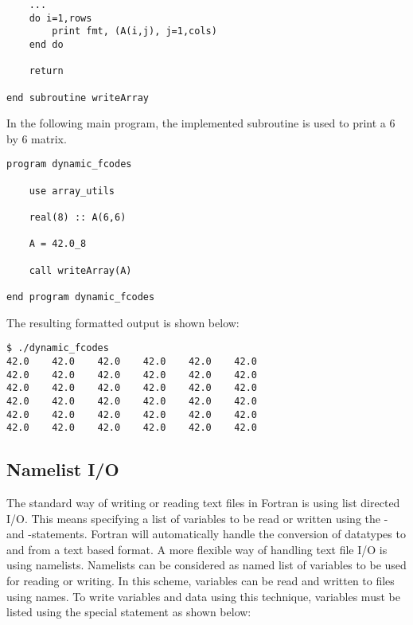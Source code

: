 \begin{lstlisting}
	...
	do i=1,rows
		print fmt, (A(i,j), j=1,cols)
	end do
		
	return
	
end subroutine writeArray
\end{lstlisting}

In the following main program, the implemented  subroutine is used to print a 6 by 6 matrix.

\begin{lstlisting}
program dynamic_fcodes

	use array_utils

	real(8) :: A(6,6)
	
	A = 42.0_8
	
	call writeArray(A)
	
end program dynamic_fcodes
\end{lstlisting}

The resulting formatted output is shown below:

\cmdmode

\begin{lstlisting}
$ ./dynamic_fcodes 
42.0    42.0    42.0    42.0    42.0    42.0    
42.0    42.0    42.0    42.0    42.0    42.0    
42.0    42.0    42.0    42.0    42.0    42.0    
42.0    42.0    42.0    42.0    42.0    42.0    
42.0    42.0    42.0    42.0    42.0    42.0    
42.0    42.0    42.0    42.0    42.0    42.0    
\end{lstlisting}%

\fmode

\subsection{Namelist I/O}

The standard way of writing or reading text files in Fortran is using list directed I/O. This means specifying a list of variables to be read or written using the - and -statements. Fortran will automatically handle the conversion of datatypes to and from a text based format. A more flexible way of handling text file I/O is using namelists. Namelists can be considered as named list of variables to be used for reading or writing. In this scheme, variables can be read and written to files using names. To write variables and data using this technique, variables must be listed using the special  statement as shown below:

